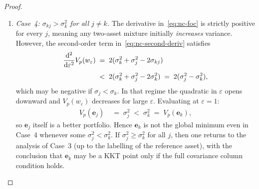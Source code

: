 \documentclass[12pt,openany]{book}
\newcommand{\bfw}{\mathbf{w}}
\newcommand{\bfe}{\mathbf{e}}
\numberwithin{equation}{chapter}
\theoremstyle{plain}
\theoremstyle{definition}
\theoremstyle{remark}
\def\bfw{w}%
\begin{document}
\begin{proof}
\begin{enumerate}
\begin{enumerate}
          \item \emph{Case~4: $\sigma_{kj} > \sigma_k^2$ for all
                $j \neq k$.}
                The derivative in~\eqref{eq:nc-foc} is strictly
                positive for every $j$, meaning any two-asset mixture
                initially \emph{increases} variance.  However,
                the second-order term in~\eqref{eq:nc-second-deriv}
                satisfies
                \begin{align}
                  \frac{\mathrm{d}^2}{\mathrm{d}\varepsilon^2}
                  V_p(\bfw_\varepsilon)
                  &\;=\; 2(\sigma_k^2 + \sigma_j^2 - 2\sigma_{kj})
                  \notag\\[4pt]
                  &\;<\; 2(\sigma_k^2 + \sigma_j^2
                             - 2\sigma_k^2)
                   \;=\; 2(\sigma_j^2 - \sigma_k^2),
                  \label{eq:nc-case4-second}
                \end{align}
                which may be negative if $\sigma_j < \sigma_k$.
                In that regime the quadratic in $\varepsilon$ opens
                downward and $V_p(\bfw_\varepsilon)$ decreases for
                large $\varepsilon$.  Evaluating at $\varepsilon=1$:
                \begin{align}
                  V_p(\bfe_j)
                  &\;=\; \sigma_j^2
                   \;<\; \sigma_k^2
                   \;=\; V_p(\bfe_k),
                  \label{eq:nc-case4-endpoint}
                \end{align}
                so $\bfe_j$ itself is a better portfolio.  Hence
                $\bfe_k$ is not the global minimum even in Case~4
                whenever some $\sigma_j^2 < \sigma_k^2$.
                If $\sigma_j^2 \geq \sigma_k^2$ for all $j$, then
                one returns to the analysis of Case~3 (up to the
                labelling of the reference asset), with the
                conclusion that $\bfe_k$ may be a KKT point only if
                the full covariance column condition holds.

        \end{enumerate}


\end{enumerate}
\end{proof}
\end{document}
